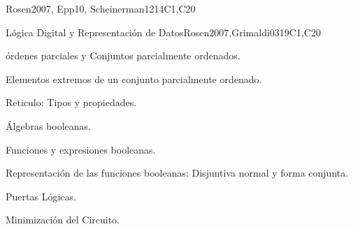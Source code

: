 \begin{syllabus}
\begin{unit}{\DSProofTechniques}{}{Rosen2007, Epp10, Scheinerman12}{14}{C1,C20}
\begin{topics}
        \item \DSProofTechniquesTopicNotions%
        \item \DSProofTechniquesTopicThe%
        \item \DSProofTechniquesTopicDirect%
        \item \DSProofTechniquesTopicDisproving%
        \item \DSProofTechniquesTopicProof%
        \item \DSProofTechniquesTopicInduction%
        \item \DSProofTechniquesTopicStructural%
        \item \DSProofTechniquesTopicWeak%
        \item \DSProofTechniquesTopicRecursive%
        \item \DSProofTechniquesTopicWell%
\end{topics}

\begin{learningoutcomes}
	\item \DSProofTechniquesLOIdentifyTheUsed [\Assessment]
	\item \DSProofTechniquesLOOutline [\Usage ]
	\item \DSProofTechniquesLOApplyEach [\Usage ]
	\item \DSProofTechniquesLODetermineWhich [\Assessment]
	\item \DSProofTechniquesLOExplainTheIdeas [\Familiarity ]
	\item \DSProofTechniquesLOExplainTheWeak [\Assessment]
	\item \DSProofTechniquesLOStateThe [\Familiarity]
\end{learningoutcomes}
\end{unit}

\begin{unit}{Lógica Digital y Representación de Datos}{}{Rosen2007,Grimaldi03}{19}{C1,C20}
   \begin{topics}
	\item órdenes parciales y Conjuntos parcialmente ordenados.   
 	\item Elementos extremos de un conjunto parcialmente ordenado.
	\item Reticulo: Tipos y propiedades.
	\item Álgebras booleanas.
	\item Funciones y expresiones booleanas.
	\item Representación de las funciones booleanas: Disjuntiva normal y forma conjunta.
	\item Puertas Lógicas.
	\item Minimización del Circuito.
   \end{topics}


\end{unit}
\end{syllabus}
